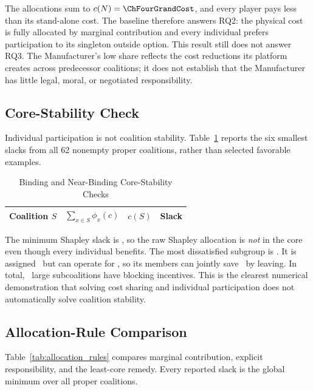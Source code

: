 The allocations sum to $c(N)=\ChFourGrandCost$, and every player pays less than its stand-alone cost. The baseline therefore answers RQ2: the physical cost is fully allocated by marginal contribution and every individual prefers participation to its singleton outside option. This result still does not answer RQ3. The Manufacturer's low share reflects the cost reductions its platform creates across predecessor coalitions; it does not establish that the Manufacturer has little legal, moral, or negotiated responsibility.

\subsection{Core-Stability Check}

Individual participation is not coalition stability. Table~\ref{tab:core_check} reports the six smallest slacks from all 62 nonempty proper coalitions, rather than selected favorable examples.

\begin{table}[htbp]
\centering
\caption{Binding and Near-Binding Core-Stability Checks}
\label{tab:core_check}
\begin{tabular}{lccc}
\toprule
\textbf{Coalition $S$} & $\sum_{x\in S}\phi_x(c)$ & $c(S)$ & \textbf{Slack} \\
\midrule

\end{tabular}
\end{table}

The minimum Shapley slack is \ChFourMinSlack, so the raw Shapley allocation is \emph{not} in the core even though every individual benefits. The most dissatisfied subgroup is \ChFourWorstCoalition. It is assigned \ChFourWorstCoalitionPayment\ but can operate for \ChFourWorstCoalitionCost, so its members can jointly save \ChFourWorstCoalitionGain\ by leaving. In total, \ChFourBlockingCount\ large subcoalitions have blocking incentives. This is the clearest numerical demonstration that solving cost sharing and individual participation does not automatically solve coalition stability.

\subsection{Allocation-Rule Comparison}

Table~\ref{tab:allocation_rules} compares marginal contribution, explicit responsibility, and the least-core remedy. Every reported slack is the global minimum over all proper coalitions.

